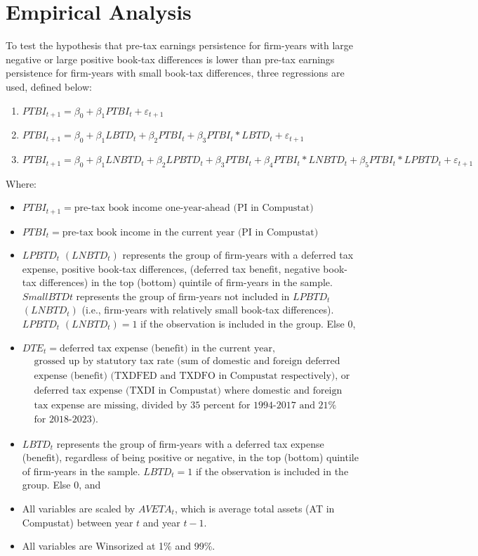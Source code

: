 \documentclass[12pt]{article}
\begin{document}
\section{Empirical Analysis}
To test the hypothesis that pre-tax earnings persistence for firm-years with large negative or large positive book-tax differences is lower than pre-tax earnings persistence for firm-years with small book-tax differences, three regressions are used, defined below:
\begin{enumerate}
    \item $PTBI_{t+1} = \beta_0 + \beta_1PTBI_t + \varepsilon_{t+1}$
    \item $PTBI_{t+1} = \beta_0 + \beta_1LBTD_t + \beta_2PTBI_t + \beta_3PTBI_t * LBTD_t + \varepsilon_{t+1}$
    \item $PTBI_{t+1} = \beta_0 + \beta_1LNBTD_t + \beta_2LPBTD_t + \beta_3PTBI_t + \beta_4PTBI_t * LNBTD_t + \beta_5PTBI_t * LPBTD_t + \varepsilon_{t+1}$
\end{enumerate}
Where:
\begin{itemize}
    \item $PTBI_{t+1} = \text{pre-tax book income one-year-ahead (PI in Compustat)}$
    \item $PTBI_t = \text{pre-tax book income in the current year (PI in Compustat)}$
    \item $LPBTD_t$ $(LNBTD_t)$ represents the group of firm-years with a deferred tax expense, positive book-tax differences, (deferred tax benefit, negative book-tax differences) in the top (bottom) quintile of firm-years in the sample. $SmallBTDt$  represents the group of firm-years not included in $LPBTD_t$ $(LNBTD_t)$ (i.e., firm-years with relatively small book-tax differences). $LPBTD_t$ $(LNBTD_t) = 1$ if the observation is included in the group. Else $0$,
    \item $DTE_t = \text{deferred tax expense (benefit) in the current year,}$
\begin{align*}
&\text{grossed up by statutory tax rate (sum of domestic and foreign deferred tax} \\
&\text{expense (benefit) (TXDFED and TXDFO in Compustat respectively), or total} \\
&\text{deferred tax expense (TXDI in Compustat) where domestic and foreign deferred}\\ &\text{tax expense are missing, divided by 35 percent for 1994-2017 and 21\%} \\
&\text{for 2018-2023).}
\end{align*}

    \item $LBTD_t$ represents the group of firm-years with a deferred tax expense (benefit), regardless of being positive or negative, in the top (bottom) quintile of firm-years in the sample. $LBTD_t = 1$ if the observation is included in the group. Else $0$, and
    \item All variables are scaled by $AVETA_t$, which is average total assets (AT in Compustat) between year $t$ and year $t-1$.
    \item All variables are Winsorized at 1\% and 99\%.
\end{itemize}
\end{document}
